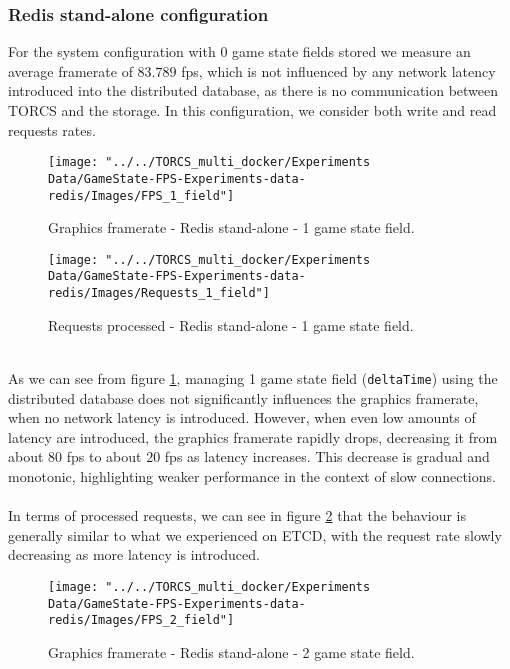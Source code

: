 \subsubsection{Redis stand-alone configuration}
For the system configuration with 0 game state fields stored we measure an average framerate of $83.789$ fps, which is not influenced by any network latency introduced into the distributed database, as there is no communication between TORCS and the storage. In this configuration, we consider both write and read requests rates.
\begin{figure}[h!]
	\centering
	\texttt{[image: "../../TORCS\_multi\_docker/Experiments Data/GameState-FPS-Experiments-data-redis/Images/FPS\_1\_field"]}
	\caption[Graphics framerate - Redis stand-alone - 1 game state field]{Graphics framerate - Redis stand-alone - 1 game state field.}
	\label{fig:fps-1-field-redis}
\end{figure}
\begin{figure}[h!]
	\centering
	\texttt{[image: "../../TORCS\_multi\_docker/Experiments Data/GameState-FPS-Experiments-data-redis/Images/Requests\_1\_field"]}
	\caption[Requests processed - Redis stand-alone - 1 game state field]{Requests processed - Redis stand-alone - 1 game state field.}
	\label{fig:requests-1-field-redis}
\end{figure}
\\ As we can see from figure \ref{fig:fps-1-field-redis}, managing 1 game state field (\texttt{deltaTime}) using the distributed database does not significantly influences the graphics framerate, when no network latency is introduced. However, when even low amounts of latency are introduced, the graphics framerate rapidly drops, decreasing it from about $80$ fps to about $20$ fps as latency increases. This decrease is gradual and monotonic, highlighting weaker performance in the context of slow connections. \\ \\
In terms of processed requests, we can see in figure \ref{fig:requests-1-field-redis} that the behaviour is generally similar to what we experienced on ETCD, with the request rate slowly decreasing as more latency is introduced. \\
\begin{figure}[h!]
	\centering
	\texttt{[image: "../../TORCS\_multi\_docker/Experiments Data/GameState-FPS-Experiments-data-redis/Images/FPS\_2\_field"]}
	\caption[Graphics framerate - Redis stand-alone - 2 game state field]{Graphics framerate - Redis stand-alone - 2 game state field.}
	\label{fig:fps-2-field-redis}
\end{figure}
